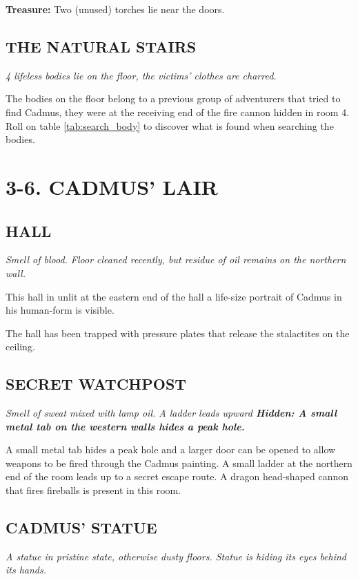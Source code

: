 \documentclass[letterpaper,sansserif,tightsqueeze]{rpg-module}
\begin{document}
\textbf{Treasure:} Two (unused) torches lie near the doors.

\subsection{THE NATURAL STAIRS}
\textit{4 lifeless bodies lie on the floor, the victims' clothes are charred.}

The bodies on the floor belong to a previous group of adventurers that tried to find Cadmus, they were at the receiving end of the fire cannon hidden in room 4. Roll on table \ref{tab:search_body} to discover what is found when searching the bodies.

\section{3-6. CADMUS' LAIR}

\setcounter{subsection}{2}

\subsection{HALL}
\textit{Smell of blood. Floor cleaned recently, but residue of oil remains on the northern wall.}

This hall in unlit at the eastern end of the hall a life-size portrait of Cadmus in his human-form is visible.

The hall has been trapped with pressure plates that release the stalactites on the ceiling.

\subsection{SECRET WATCHPOST}
\textit{Smell of sweat mixed with lamp oil. A ladder leads upward \textbf{Hidden: A small metal tab on the western walls hides a peak hole.}}

A small metal tab hides a peak hole and a larger door can be opened to allow weapons to be fired through the Cadmus painting. A small ladder at the northern end of the room leads up to a secret escape route. A dragon head-shaped cannon that fires fireballs is present in this room.

\subsection{CADMUS' STATUE}
\textit{A statue in pristine state, otherwise dusty floors. Statue is hiding its eyes behind its hands.}
\end{document}
